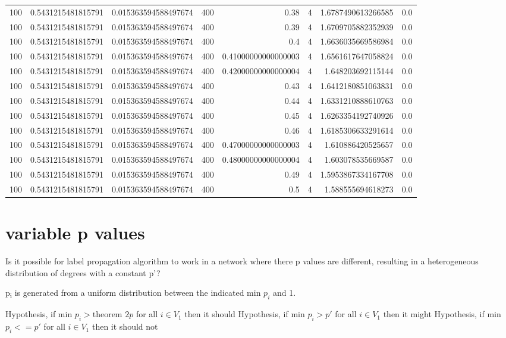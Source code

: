 \documentclass[11pt]{article}
\begin{document}
\begin{center}
\begin{tabular}{rrrrrrrr}
100 & 0.5431215481815791 & 0.015363594588497674 & 400 & 0.38 & 4 & 1.6787490613266585 & 0.0\\
100 & 0.5431215481815791 & 0.015363594588497674 & 400 & 0.39 & 4 & 1.6709705882352939 & 0.0\\
100 & 0.5431215481815791 & 0.015363594588497674 & 400 & 0.4 & 4 & 1.6636035669586984 & 0.0\\
100 & 0.5431215481815791 & 0.015363594588497674 & 400 & 0.41000000000000003 & 4 & 1.6561617647058824 & 0.0\\
100 & 0.5431215481815791 & 0.015363594588497674 & 400 & 0.42000000000000004 & 4 & 1.648203692115144 & 0.0\\
100 & 0.5431215481815791 & 0.015363594588497674 & 400 & 0.43 & 4 & 1.6412180851063831 & 0.0\\
100 & 0.5431215481815791 & 0.015363594588497674 & 400 & 0.44 & 4 & 1.6331210888610763 & 0.0\\
100 & 0.5431215481815791 & 0.015363594588497674 & 400 & 0.45 & 4 & 1.6263354192740926 & 0.0\\
100 & 0.5431215481815791 & 0.015363594588497674 & 400 & 0.46 & 4 & 1.6185306633291614 & 0.0\\
100 & 0.5431215481815791 & 0.015363594588497674 & 400 & 0.47000000000000003 & 4 & 1.610886420525657 & 0.0\\
100 & 0.5431215481815791 & 0.015363594588497674 & 400 & 0.48000000000000004 & 4 & 1.603078535669587 & 0.0\\
100 & 0.5431215481815791 & 0.015363594588497674 & 400 & 0.49 & 4 & 1.5953867334167708 & 0.0\\
100 & 0.5431215481815791 & 0.015363594588497674 & 400 & 0.5 & 4 & 1.588555694618273 & 0.0\\
\end{tabular}
\end{center}

\section{variable p values}
\label{sec:org89d2a5f}

Is it possible for label propagation algorithm to work in a network where
there p values are different, resulting in a heterogeneous distribution of 
degrees with a constant p'?

p\textsubscript{i} is generated from a uniform distribution between the indicated min \(p_i\) and 1.

Hypothesis, if min \(p_i > \text{theorem 2} p\) for all \(i \in V_1\) then it should
Hypothesis, if min \(p_i > p'\) for all \(i \in V_1\) then it might
Hypothesis, if min \(p_i <= p'\) for all \(i \in V_1\) then it should not
\end{document}
